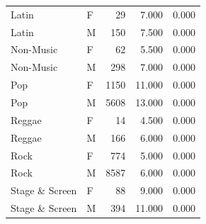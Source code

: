 \begin{table}
\begin{tabular}{llrrr}
                 Latin &      F &    29 &             7.000 &                0.000 \\
                 Latin &      M &   150 &             7.500 &                0.000 \\
             Non-Music &      F &    62 &             5.500 &                0.000 \\
             Non-Music &      M &   298 &             7.000 &                0.000 \\
                   Pop &      F &  1150 &            11.000 &                0.000 \\
                   Pop &      M &  5608 &            13.000 &                0.000 \\
                Reggae &      F &    14 &             4.500 &                0.000 \\
                Reggae &      M &   166 &             6.000 &                0.000 \\
                  Rock &      F &   774 &             5.000 &                0.000 \\
                  Rock &      M &  8587 &             6.000 &                0.000 \\
        Stage \& Screen &      F &    88 &             9.000 &                0.000 \\
        Stage \& Screen &      M &   394 &            11.000 &                0.000 \\
\bottomrule
\end{tabular}
\end{table}
